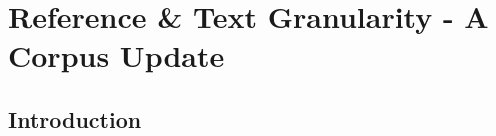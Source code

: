 \section{Reference \& Text Granularity - A Corpus Update}\label{sec:covgran-ux22}


\subsection{Introduction}





